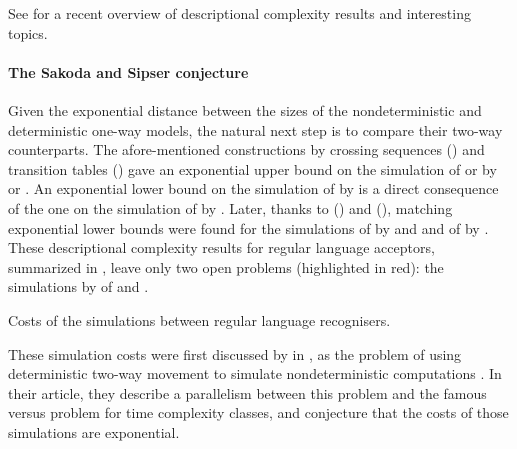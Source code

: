 See \cite{KutMor+21} for a recent overview of descriptional complexity results and interesting topics.

\paragraph{The Sakoda and Sipser conjecture} Given the exponential distance between the sizes of the nondeterministic and deterministic one-way models, the natural next step is to compare their two-way counterparts.
The afore-mentioned constructions by crossing sequences (\cite{RabSco59}) and transition tables (\cite{She59}) gave an exponential upper bound on the simulation of \TNFA or \TDFA by \ONFA or \ODFA.
An exponential lower bound on the simulation of \TNFA by \ODFA is a direct consequence of the one on the simulation of \ONFA by \ODFA.
Later, thanks to \citeauthor{Bir93} (\citeyear{Bir93}) and \citeauthor{Kap05} (\citeyear{Kap05}), matching exponential lower bounds were found for the simulations of \TDFA by \ONFA and \ODFA and of \TNFA by \ONFA \cite{Bir93,Kap05}.
These descriptional complexity results for regular language acceptors, summarized in , leave only two open problems (highlighted in red): the simulations by \TDFA of \TNFA and \ONFA.

\begin{table}
	\centering
	
	\caption{Costs of the simulations between regular language recognisers.}
	\label{tab:sims-core-general-context}
\end{table}

These simulation costs were first discussed by \citeauthor{SakSip78} in \citeyear{SakSip78}, as the problem of using deterministic two-way movement to simulate nondeterministic computations \cite{SakSip78}.
In their article, they describe a parallelism between this problem and the famous \cP versus \cNP problem for time complexity classes, and conjecture that the costs of those simulations are exponential.

